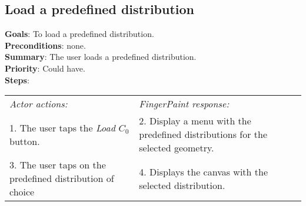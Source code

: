 \begin{appendices}
  \section{Load a predefined distribution}
  \textbf{Goals}: To load a predefined distribution.\\
  \textbf{Preconditions}: none.\\
  \textbf{Summary}: The user loads a predefined distribution.\\
  \textbf{Priority}: Could have.\\
  \textbf{Steps}: \\
  \begin{tabular}{ p{} p{} }
  	\emph{Actor actions:} & \emph{FingerPaint response:} \\
	1. The user taps the \emph{Load $C_0$} button. & 2. Display a menu with the predefined distributions for the selected geometry. \\
	3. The user taps on the predefined distribution of choice & 4.	Displays the canvas with the selected distribution. \\
  \end{tabular}


\end{appendices}
